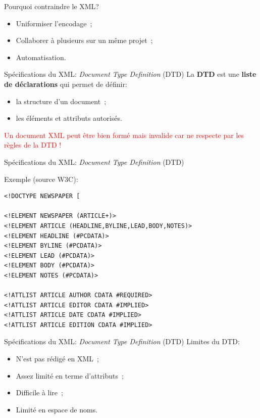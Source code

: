 \begin{frame}{Pourquoi contraindre le XML?}
    \begin{itemize}
        \item Uniformiser l'encodage~;
        \item Collaborer à plusieurs sur un même projet~;
        \item Automatisation.
    \end{itemize}
\end{frame}

\begin{frame}{Spécifications du XML: \textit{Document Type Definition} (DTD)}
    La \textbf{DTD} est une \textbf{liste de déclarations} qui permet de définir:
    \begin{itemize}
        \item la structure d'un document~;
        \item les éléments et attributs autorisés.
    \end{itemize}
    \textcolor{red}{\textrightarrow{} Un document XML peut être bien formé mais invalide car ne respecte par les règles de la DTD !}
\end{frame}

\begin{frame}[fragile]{Spécifications du XML: \textit{Document Type Definition} (DTD)}
    \begin{block}{Exemple (source W3C):}
\begin{lstlisting}
<!DOCTYPE NEWSPAPER [

<!ELEMENT NEWSPAPER (ARTICLE+)>
<!ELEMENT ARTICLE (HEADLINE,BYLINE,LEAD,BODY,NOTES)>
<!ELEMENT HEADLINE (#PCDATA)>
<!ELEMENT BYLINE (#PCDATA)>
<!ELEMENT LEAD (#PCDATA)>
<!ELEMENT BODY (#PCDATA)>
<!ELEMENT NOTES (#PCDATA)>

<!ATTLIST ARTICLE AUTHOR CDATA #REQUIRED>
<!ATTLIST ARTICLE EDITOR CDATA #IMPLIED>
<!ATTLIST ARTICLE DATE CDATA #IMPLIED>
<!ATTLIST ARTICLE EDITION CDATA #IMPLIED>
\end{lstlisting}

    \end{block}
        
\end{frame}

\begin{frame}{Spécifications du XML: \textit{Document Type Definition} (DTD)}
    Limites du DTD:
    \begin{itemize}
        \item N'est pas rédigé en XML~;
        \item Assez limité en terme d'attributs~;
        \item Difficile à lire~;
        \item Limité en espace de noms.
    \end{itemize}
\end{frame}

